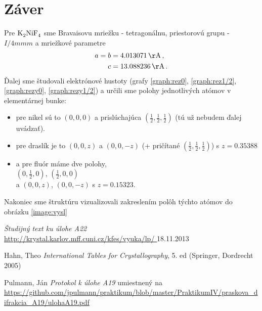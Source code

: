 \documentclass[a4paper, 10pt]{article}
\newcommand{\unit}[1]{\ensuremath{\, \mathrm{#1}}}
\begin{document}
\section*{Záver}
Pre $\ce{K2NiF4}$ sme Bravaisovu mriežku - tetragonálnu, priestorovú grupu - $I/4mmm$ a mriežkové parametre
\begin{align*}
 a =b &= 4.013071\unit\AA  \,, \\
 c &= 13.088236 \unit\AA \,.
\end{align*}
Ďalej sme študovali elektrónové hustoty (grafy \ref{graph:rez0}, \ref{graph:rez1/2}, \ref{graph:rezy0}, \ref{graph:rezy1/2}) a určili sme polohy jednotlivých atómov v elementárnej bunke:
\begin{itemize}
\item pre nikel sú to $(0,0,0)$ a prislúchajúca $(\frac 12,\frac 12,\frac 12)$ (tú už nebudem ďalej uvádzať).
\item pre draslík je to $(0,0,z)$ a $(0,0,-z)$ (+ pričítané  $(\frac 12,\frac 12,\frac 12)$) s $z=0.35388$
\item a pre fluór máme dve polohy, \\
    $(0,\frac 12, 0)$, $(\frac 12,0,0)$ \\
    a $(0,0,z)$, $(0,0,-z)$ s $z=0.15323$.
\end{itemize}
Nakoniec sme štruktúru vizualizovali zakreslením polôh týchto atómov do obrázku \ref{image:vysl}

\begin{thebibliography}{9}

    \emph{Študijný text ku úlohe A22} \\
    \url{http://krystal.karlov.mff.cuni.cz/kfes/vyuka/lp/
} 18.11.2013

    Hahn, Theo \textit{International Tables for Crystallography}, 5. ed (Springer, Dordrecht 2005)

    Pulmann, Ján \textit{Protokol k úlohe A19} {\tiny umiestnený na} \\{\footnotesize \mbox{\url{https://github.com/jpulmann/praktikum/blob/master/PraktikumIV/praskova_difrakcia_A19/ulohaA19.pdf}}}
\end{thebibliography}
\end{document}
